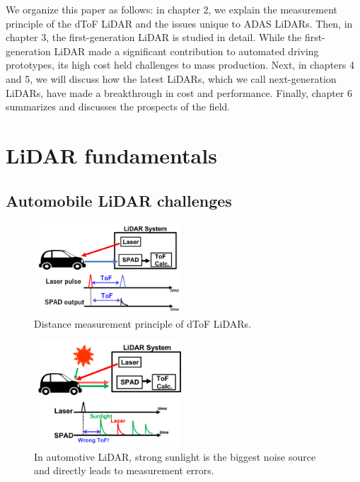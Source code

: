 \documentclass[paper]{ieice}
\begin{document}
We organize this paper as follows: in chapter 2, we explain the measurement principle of the dToF LiDAR and the issues unique to ADAS LiDARs. Then, in chapter 3, the first-generation LiDAR is studied in detail. While the first-generation LiDAR made a significant contribution to automated driving prototypes, its high cost held challenges to mass production. Next, in chapters 4 and 5, we will discuss how the latest LiDARs, which we call next-generation LiDARs, have made a breakthrough in cost and performance. Finally, chapter 6 summarizes and discusses the prospects of the field.

\section{LiDAR fundamentals}
\subsection{Automobile LiDAR challenges}
\begin{figure}[!t]
\centering
 \includegraphics[width=0.49\textwidth]{figs/lidar.png}
  \caption{Distance measurement principle of dToF LiDARs.}
\label{lidar}
\end{figure}

\begin{figure}[!t]
\centering
 \includegraphics[width=0.49\textwidth]{figs/sunlight.png}
  \caption{In automotive LiDAR, strong sunlight is the biggest noise source and directly leads to measurement errors.}
\label{sunlight}
\end{figure}
\end{document}
